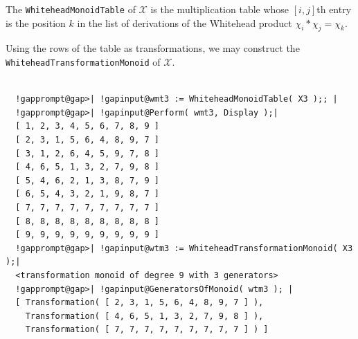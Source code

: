 \documentclass[a4paper,11pt]{report}
\newcommand{\calX}{\mathcal{X}}
\begin{document}
{{{ The \texttt{WhiteheadMonoidTable} of $\calX$ is the multiplication table whose $[i,j]$\texttt{}th entry is the position $k$ in the list of derivations of the Whitehead product $\chi_i*\chi_j = \chi_k$. 

 Using the rows of the table as transformations, we may construct the \texttt{WhiteheadTransformationMonoid} of $\calX$. }

 

 
\begin{Verbatim}[commandchars=!@|,fontsize=\small,frame=single,label=Example]
  
  !gapprompt@gap>| !gapinput@wmt3 := WhiteheadMonoidTable( X3 );; |
  !gapprompt@gap>| !gapinput@Perform( wmt3, Display );|
  [ 1, 2, 3, 4, 5, 6, 7, 8, 9 ]
  [ 2, 3, 1, 5, 6, 4, 8, 9, 7 ]
  [ 3, 1, 2, 6, 4, 5, 9, 7, 8 ]
  [ 4, 6, 5, 1, 3, 2, 7, 9, 8 ]
  [ 5, 4, 6, 2, 1, 3, 8, 7, 9 ]
  [ 6, 5, 4, 3, 2, 1, 9, 8, 7 ]
  [ 7, 7, 7, 7, 7, 7, 7, 7, 7 ]
  [ 8, 8, 8, 8, 8, 8, 8, 8, 8 ]
  [ 9, 9, 9, 9, 9, 9, 9, 9, 9 ]
  !gapprompt@gap>| !gapinput@wtm3 := WhiteheadTransformationMonoid( X3 );|
  <transformation monoid of degree 9 with 3 generators>
  !gapprompt@gap>| !gapinput@GeneratorsOfMonoid( wtm3 ); |
  [ Transformation( [ 2, 3, 1, 5, 6, 4, 8, 9, 7 ] ), 
    Transformation( [ 4, 6, 5, 1, 3, 2, 7, 9, 8 ] ), 
    Transformation( [ 7, 7, 7, 7, 7, 7, 7, 7, 7 ] ) ]
  
\end{Verbatim}
 

}}
\end{document}
